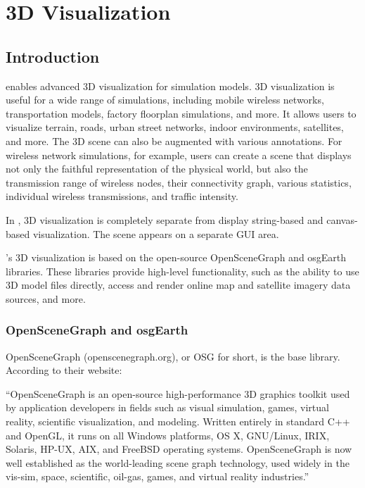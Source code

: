 \section{3D Visualization}
\label{sec:graphics:osg}

\subsection{Introduction}
\label{sec:graphics:osg-introduction}

{\opp} enables advanced 3D visualization for simulation models. 3D visualization
is useful for a wide range of simulations, including mobile wireless networks,
transportation models, factory floorplan simulations, and more. It allows users
to visualize terrain, roads, urban street networks, indoor environments,
satellites, and more. The 3D scene can also be augmented with various
annotations. For wireless network simulations, for example, users can create a
scene that displays not only the faithful representation of the physical world,
but also the transmission range of wireless nodes, their connectivity graph,
various statistics, individual wireless transmissions, and traffic intensity.

In {\opp}, 3D visualization is completely separate from display string-based and
canvas-based visualization. The scene appears on a separate GUI area.

{\opp}'s 3D visualization is based on the open-source OpenSceneGraph and
osgEarth libraries. These libraries provide high-level functionality, such as
the ability to use 3D model files directly, access and render online map and
satellite imagery data sources, and more.

\subsubsection{OpenSceneGraph and osgEarth}
\label{sec:graphics:osg-and-osgearth}

OpenSceneGraph (openscenegraph.org), or OSG for short, is the base library.
According to their website:

\begin{displayquote}
``OpenSceneGraph is an open-source high-performance 3D graphics toolkit used by
application developers in fields such as visual simulation, games, virtual
reality, scientific visualization, and modeling. Written entirely in standard
C++ and OpenGL, it runs on all Windows platforms, OS X, GNU/Linux, IRIX,
Solaris, HP-UX, AIX, and FreeBSD operating systems. OpenSceneGraph is now well
established as the world-leading scene graph technology, used widely in the
vis-sim, space, scientific, oil-gas, games, and virtual reality industries.''
\end{displayquote}

